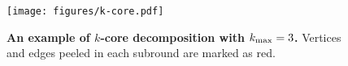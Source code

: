 \begin{figure}[t]
  \centering
  \texttt{[image: figures/k-core.pdf]}%
  \caption{\textbf{An example of $k$-core decomposition with \boldmath ${k_{\max}} = 3$.\unboldmath}
  Vertices and edges peeled in each subround are marked as red.}\label{fig:kcore_eg}
\end{figure} 